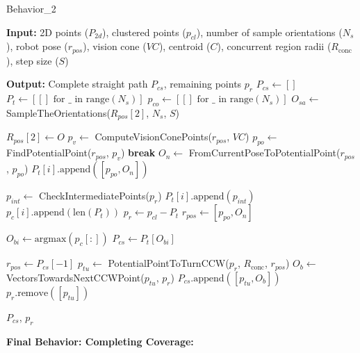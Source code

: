 \begin{algorithm}[H]
    \caption{Behavior\_2}
    \label{alg:behavioral2}
    \begin{algorithmic}[1]

    \Statex \textbf{Input:} 2D points ($P_{2d}$), clustered points ($p_{cl}$), number of sample orientations ($N_s$), robot pose ($r_{pos}$), vision cone ($VC$), centroid ($C$), concurrent region radii ($R_{\text{conc}}$), step size ($S$)

    \Statex \textbf{Output:} Complete straight path $P_{cs}$, remaining points $p_r$
    \newline
    \State $P_{cs} \leftarrow []$
    \State $P_t \leftarrow [[] \text{ for } \_ \text{ in range}(N_s)]$
    \State $p_{co} \leftarrow [[] \text{ for } \_ \text{ in range}(N_s)]$
    \State $O_{sa} \leftarrow$ SampleTheOrientations($R_{pos}[2]$, $N_s$, $S$)
    
        \State $R_{pos}[2] \leftarrow O$
            \State $p_v \leftarrow$ ComputeVisionConePoints($r_{pos}$, $VC$)
            \State $p_{po} \leftarrow$ FindPotentialPoint($r_{pos}$, $p_v$)
                \State \textbf{break}
            \EndIf
            \State $O_n \leftarrow$ FromCurrentPoseToPotentialPoint($r_{pos}$, $p_{po}$)
            \State $P_t[i].\text{append}([p_{po}, O_n])$
            
            \State $p_{int} \leftarrow$ CheckIntermediatePoints($p_r$)
            \State $P_t[i].\text{append}(p_{int})$
            \State $p_c[i].\text{append}(\text{len}(P_t))$
            \State $p_r \leftarrow p_{cl} - P_t$
            \State $r_{pos} \leftarrow [p_{po}, O_n]$
        \EndWhile
    \EndFor
    
    \State $O_{bi} \leftarrow \text{argmax}(p_c[:])$
    \State $P_{cs} \leftarrow P_t[O_{bi}]$
    
    \State $r_{pos} \leftarrow P_{cs}[-1]$
    \State $p_{tu} \leftarrow$ PotentialPointToTurnCCW($p_r$, $R_{\text{conc}}$, $r_{pos}$)
    \State $O_b \leftarrow$ VectorsTowardsNextCCWPoint($p_{tu}$, $p_r$)
    \State $P_{cs}.\text{append}([p_{tu}, O_b])$
    \State $p_r.\text{remove}([p_{tu}])$

    \State \Return $P_{cs}$, $p_r$
    \end{algorithmic}
    \end{algorithm}
    


\textbf{Final Behavior: Completing Coverage: }



